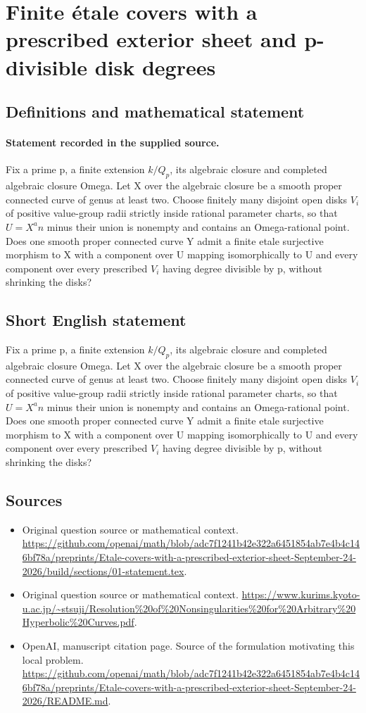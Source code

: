 \documentclass[11pt]{article}
\begin{document}
\section*{Finite étale covers with a prescribed exterior sheet and p-divisible disk degrees}\label{statement}
\subsection{Definitions and mathematical statement}
\paragraph{Statement recorded in the supplied source.}
Fix a prime p, a finite extension $k/Q_p$, its algebraic closure and completed algebraic closure Omega. Let X over the algebraic closure be a smooth proper connected curve of genus at least two. Choose finitely many disjoint open disks $V_i$ of positive value-group radii strictly inside rational parameter charts, so that $U=X^an$ minus their union is nonempty and contains an Omega-rational point. Does one smooth proper connected curve Y admit a finite etale surjective morphism to X with a component over U mapping isomorphically to U and every component over every prescribed $V_i$ having degree divisible by p, without shrinking the disks?
\subsection{Short English statement}
Fix a prime p, a finite extension $k/Q_p$, its algebraic closure and completed algebraic closure Omega. Let X over the algebraic closure be a smooth proper connected curve of genus at least two. Choose finitely many disjoint open disks $V_i$ of positive value-group radii strictly inside rational parameter charts, so that $U=X^an$ minus their union is nonempty and contains an Omega-rational point. Does one smooth proper connected curve Y admit a finite etale surjective morphism to X with a component over U mapping isomorphically to U and every component over every prescribed $V_i$ having degree divisible by p, without shrinking the disks?
\subsection{Sources}
\begin{itemize}
\item[S1] Original question source or mathematical context.
\url{https://github.com/openai/math/blob/adc7f1241b42e322a6451854ab7e4b4c146bf78a/preprints/Etale-covers-with-a-prescribed-exterior-sheet-September-24-2026/build/sections/01-statement.tex}.
\item[S2] Original question source or mathematical context.
\url{https://www.kurims.kyoto-u.ac.jp/~stsuji/Resolution%20of%20Nonsingularities%20for%20Arbitrary%20Hyperbolic%20Curves.pdf}.
\item[S3] OpenAI, manuscript citation page. Source of the formulation motivating this local problem.
\url{https://github.com/openai/math/blob/adc7f1241b42e322a6451854ab7e4b4c146bf78a/preprints/Etale-covers-with-a-prescribed-exterior-sheet-September-24-2026/README.md}.
\end{itemize}
\end{document}
